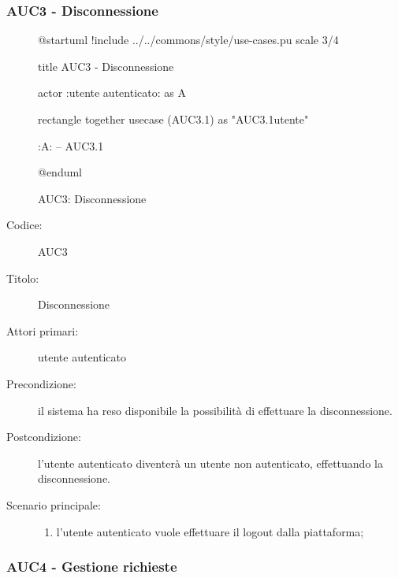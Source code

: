 \documentclass[casi-duso]{subfiles}
\begin{document}
\subsubsection{AUC3 - Disconnessione}%
\label{subsub:AUC3}

\begin{figure}[h!] 
  \centering 
  \begin{plantuml}
  @startuml
  !include ../../commons/style/use-cases.pu
  scale 3/4

  title AUC3 - Disconnessione

  actor :utente autenticato: as A

  rectangle {
    together {
      usecase (AUC3.1) as "AUC3.1\nDisconnessione utente"
    }
  }

  :A: -- AUC3.1

  @enduml
  \end{plantuml} 
  \caption{AUC3: Disconnessione} 
  \label{fig:auc3} 
\end{figure}

\begin{description}
  \item[Codice:] AUC3
  \item[Titolo:] Disconnessione
  \item[Attori primari:] utente autenticato
  \item[Precondizione:] il sistema ha reso disponibile la possibilità di effettuare la disconnessione.
  \item[Postcondizione:] l'utente autenticato diventerà un utente non autenticato, effettuando la disconnessione.
  \item[Scenario principale:] 
  \begin{enumerate}
    \item l'utente autenticato vuole effettuare il logout dalla piattaforma;
  \end{enumerate}
\end{description}

\subsubsection{AUC4 - Gestione richieste}%
\label{subsub:AUC4}
\end{document}
